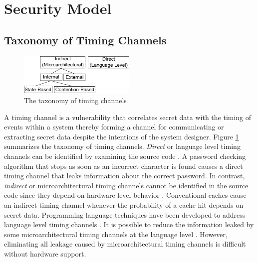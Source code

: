 \section{Security Model}

\subsection{Taxonomy of Timing Channels}

    \begin{figure}
        \begin{center}
            \includegraphics[width=2.2in]{figs/taxonomy.pdf}
            \caption{The taxonomy of timing channels}
            \label{fig:taxonomy}
        \end{center}
    \end{figure}

A timing channel is a vulnerability that correlates secret data with the  
timing of events within a system thereby forming a channel for communicating or 
extracting secret data despite the intentions of the system designer. Figure 
\ref{fig:taxonomy} summarizes the taxonomy of timing channels. \emph{Direct} or 
language level timing channels can be identified by examining the source code 
\cite{mitigation3}. A password checking algorithm that stops as soon as an 
incorrect character is found causes a direct timing channel that leaks 
information about the correct password. In contrast, \emph{indirect} or 
microarchitectural timing channels cannot be identified in the source code 
since they depend on hardware level behavior \cite{mitigation3}. Conventional 
caches cause an indirect timing channel whenever the probability of a cache hit 
depends on secret data. Programming language techniques have been developed to 
address language level timing channels 
\cite{timesens,mitigation1,mitigation2,mitigation3}. It is possible to reduce 
the information leaked by some microarchitectural timing channels at the 
language level \cite{mitigation3}. However, eliminating all leakage caused by 
microarchitectural timing channels is difficult without hardware support.

